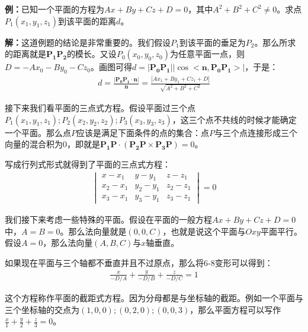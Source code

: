 \documentclass{ctexart}
\let\oldtextbf\textbf %
\renewcommand{\textbf}[1]{\textcolor{btex}{\oldtextbf{#1}}} %
\begin{document}
\textbf{例：}已知一个平面的方程为$Ax+By+Cz+D=0$，其中$A^2+B^2+C^2\neq 0$。求点$P_1(x_1,y_1,z_1)$到该平面的距离$d$。

\textbf{解：}这道例题的结论是非常重要的。我们假设$P_1$到该平面的垂足为$P_2$。那么所求的距离就是$\bm{P_1P_2}$的模长。又设$P_0(x_0,y_0,z_0)$为任意平面一点，则$D=-Ax_0-By_0-Cz_0$。画图可得$d=|\bm{P_0P_1}||\cos<\bm{n},\bm{P_0P_1}>|$，于是：
\begin{align*}
    d=\frac{|\bm{P_0P_1}\cdot\bm{n}|}{\bm{n}}=\frac{|Ax_1+By_1+Cz_1+D|}{\sqrt{A^2+B^2+C^2}}\tag{6-9}
\end{align*}

接下来我们看平面的三点式方程。假设平面过三个点$P_1(x_1,y_1,z_1);P_2(x_2,y_2,z_2);P_3(x_3,y_3,z_3)$，这三个点不共线的时候才能确定一个平面。那么点$P$应该是满足下面条件的点的集合：点$P$与三个点连接形成三个向量的混合积为0，即就是$\bm{P_1P}\cdot(\bm{P_2P}\times\bm{P_3P})=0$。

\begin{tcolorbox}[
    colback=bac1,     %
    colframe=fra1,   %
    coltitle=white,             %
    coltext=tex1,
    title=平面的三点式方程,
    fonttitle=\bfseries,        %
arc=3mm,                     %
breakable
]
写成行列式形式就得到了平面的三点式方程：
\begin{align*}
\begin{vmatrix}
 x-x_1 & y-y_1 & z-z_1\\
x_2-x_1  & y_2-y_1  &z_2-z_1 \\
  x_3-x_1 & y_3-y_1  & z_3-z_1
\end{vmatrix}=0\tag{6-10} 
\end{align*}
\end{tcolorbox}

我们接下来考虑一些特殊的平面。假设在平面的一般方程$Ax+By+Cz+D=0$中，$A=B=0$。那么法向量就是$(0,0,C)$，也就是说这个平面与$Oxy$平面平行。假设$A=0$，那么法向量$(A,B,C)$与$x$轴垂直。

\begin{tcolorbox}[
    colback=bac1,     %
    colframe=fra1,   %
    coltitle=white,             %
    coltext=tex1,
    title=平面的截距式方程,
    fonttitle=\bfseries,        %
arc=3mm,                     %
breakable
]
如果现在平面与三个轴都不垂直并且不过原点，那么将6-8变形可以得到：
\begin{align*}
    \frac{x}{-D/A}+\frac{y}{-D/B}+\frac{z}{-D/C}=1\tag{6-11}
\end{align*}

这个方程称作平面的截距式方程。因为分母都是与坐标轴的截距。例如一个平面与三个坐标轴的交点为$(1,0,0);(0,2,0);(0,0,3)$，那么平面方程可以写作$\frac{x}{1}+\frac{y}{2}+\frac{z}{3}=0$。
\end{tcolorbox}
\end{document}
